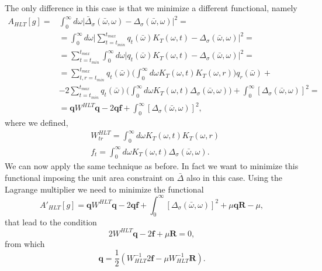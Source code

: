 \documentclass[a4paper,10pt]{article}
\begin{document}
The only difference in this case is that we minimize a different functional, namely
\begin{equation}\begin{split}\label{eq: NFunct}
A_{HLT}[g] = & \int_0^\infty d\omega \big| \bar{\Delta}_\sigma(\bar{\omega}, \omega) - \Delta_\sigma(\bar{\omega}, \omega) \big|^2 = \\ & = \int_0^\infty d\omega \big| \sum_{t=t_{min}}^{t_{max}} q_t(\bar{\omega}) K_T(\omega,t) - \Delta_\sigma(\bar{\omega}, \omega) \big|^2 = \\ & = \sum_{t=t_{min}}^{t_{max}} \int_0^\infty d\omega \big| q_t(\bar{\omega}) K_T(\omega,t) -\Delta_\sigma(\bar{\omega}, \omega) \big|^2 = \\ & = \sum_{t,r=t_{min}}^{t_{max}} q_t(\bar{\omega}) \bigg( \int_0^\infty  d\omega K_T(\omega, t) K_T(\omega, r) \bigg)q_r(\bar{\omega}) + \\ & -2 \sum_{t=t_{min}}^{t_{max}} q_t(\bar{\omega}) \bigg( \int_0^\infty  d\omega K_T(\omega, t) \Delta_\sigma(\bar{\omega}, \omega) \bigg) + \int_0^\infty [\Delta_\sigma (\bar{\omega}, \omega)]^2 = \\ & = \textbf{q} W^{HLT} \textbf{q} - 2\textbf{q} \textbf{f} + \int_0^\infty [\Delta_\sigma (\bar{\omega}, \omega)]^2, 
\end{split}\end{equation}
where we defined, 
\begin{equation}\begin{split}
& W^{HLT}_{tr} = \int_0^\infty  d\omega K_T(\omega, t) K_T(\omega, r) \\ &  f_t = \int_0^\infty  d\omega K_T(\omega, t) \Delta_\sigma(\bar{\omega}, \omega).
\end{split}\end{equation}
We can now apply the same technique as before. In fact we want to minimize this functional imposing the unit area constraint on $\bar{\Delta}$ also in this case. Using the Lagrange multiplier we need to minimize the functional
\begin{equation}
A'_{HLT}[g] = \textbf{q} W^{HLT} \textbf{q} -2 \textbf{q} \textbf{f} + \int_0^\infty [\Delta_\sigma (\bar{\omega}, \omega)]^2 + \mu \textbf{q}\textbf{R} - \mu, 
\end{equation}
that lead to the condition
\begin{equation}\label{eq: MinConNaz}
2  W^{HLT}\textbf{q} - 2\textbf{f} + \mu \textbf{R}  = 0, 
\end{equation}
from which 
\begin{equation}\label{eq: BUKNaz}
\textbf{q} = \frac{1}{2}( W_{HLT}^{-1}2\textbf{f} - \mu  W_{HLT}^{-1}\textbf{R}). 
\end{equation}
\end{document}
